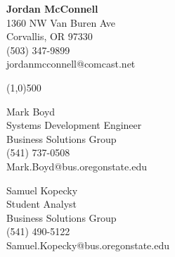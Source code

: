 \documentclass{res}
\begin{document}
\begin{resume}
\vspace{-36pt}
{\centering
{\Large \bf Jordan McConnell} \\
1360 NW Van Buren Ave \\
Corvallis, OR 97330 \\
(503) 347-9899 \\
jordanmcconnell@comcast.net
\par
}
\vspace{-12pt}
\begin{center}
\line(1,0){500}
\end{center}

\vspace{8pt}

Mark Boyd\\
Systems Development Engineer\\
Business Solutions Group\\
(541) 737-0508\\
Mark.Boyd@bus.oregonstate.edu\\

\vspace{0.2in}
\vspace{8pt}

Samuel Kopecky\\
Student Analyst\\
Business Solutions Group\\
(541) 490-5122\\
Samuel.Kopecky@bus.oregonstate.edu\\
\vspace{0.2in}
\end{resume}
\end{document}
